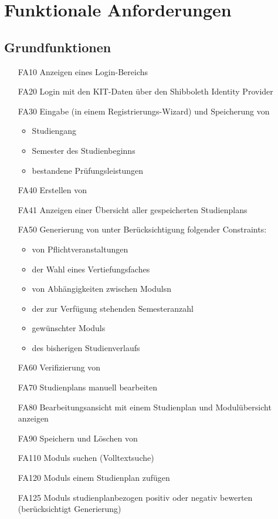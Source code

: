 \section{Funktionale Anforderungen}

	\subsection{Grundfunktionen}
	\begin{itemize}[nosep]	
		\item [FA10] Anzeigen eines Login-Bereichs
		\item[FA20] Login mit den KIT-Daten über den \gls{Shibboleth Identity Provider}
		\item [FA30]Eingabe (in einem Registrierungs-\gls{Wizard}) und Speicherung von
		\begin{itemize}[nosep]
			\item Studiengang
			\item \gls {Semester des Studienbeginns}
			\item bestandene Prüfungsleistungen
		\end{itemize}
		\item [FA40] Erstellen von 
		\item [FA41]Anzeigen einer Übersicht aller gespeicherten \glspl{Studienplan}
		\item [FA50] Generierung von  unter Berücksichtigung folgender \glspl{Constraint}:
			\begin{itemize}[nosep]
			\item von Pflichtveranstaltungen
			\item der Wahl eines Vertiefungsfaches
			\item von Abhängigkeiten zwischen \glspl{Modul}n
			\item der zur Verfügung stehenden Semesteranzahl
			\item gewünschter \glspl{Modul}
			\item des bisherigen Studienverlaufs
			\end{itemize}
		\item [FA60] \gls{Verifizierung} von 
		\item [FA70] \glspl{Studienplan} manuell bearbeiten
		\item[FA80] Bearbeitungsansicht mit einem \gls{Studienplan} und Modulübersicht anzeigen  
		\item [FA90]Speichern und Löschen von 	
		\item[FA110] \glspl{Modul} suchen (Volltextsuche)
		\item[FA120] \glspl{Modul} einem \gls{Studienplan} zufügen
		\item[FA125] \glspl{Modul} studienplanbezogen positiv oder negativ bewerten (berücksichtigt \gls{Generierung})
		\end{itemize}
